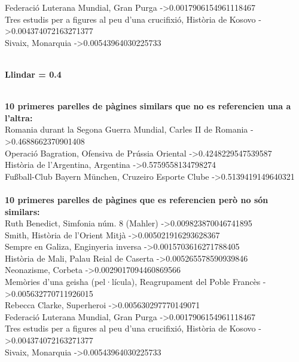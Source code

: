 \documentclass[11pt,a4paper,twoside]{report}
\begin{document}
Federació Luterana Mundial, Gran Purga -\textgreater 0.0017906154961118467 \\ 
Tres estudis per a figures al peu d'una crucifixió, Història de Kosovo -\textgreater 0.004374072163271377 \\ 
Sivaix, Monarquia -\textgreater 0.00543964030225733 \\ 
 \\ 
\newline
\centerline{ \textbf{Llindar = 0.4} }
\newline
 \\ 
\textbf{10 primeres parelles de pàgines similars que no es referencien una a l'altra:} \\ 
Romania durant la Segona Guerra Mundial, Carles II de Romania -\textgreater 0.4688662370901408 \\ 
Operació Bagration, Ofensiva de Prússia Oriental -\textgreater 0.4248229547539587 \\ 
Història de l'Argentina, Argentina -\textgreater 0.5759558134798274 \\ 
Fußball-Club Bayern München, Cruzeiro Esporte Clube -\textgreater 0.5139419149640321 \\ 
 \\ 
\textbf{10 primeres parelles de pàgines que es referencien però no són similars:} \\ 
Ruth Benedict, Simfonia núm. 8 (Mahler) -\textgreater 0.009823870046741895 \\ 
Smith, Història de l'Orient Mitjà -\textgreater 0.005021916293628367 \\ 
Sempre en Galiza, Enginyeria inversa -\textgreater 0.0015703616271788405 \\ 
Història de Mali, Palau Reial de Caserta -\textgreater 0.005265578590939846 \\ 
Neonazisme, Corbeta -\textgreater 0.0029017094460869566 \\ 
Memòries d'una geisha (pel·lícula), Reagrupament del Poble Francès -\textgreater 0.005632770711926015 \\ 
Rebecca Clarke, Superheroi -\textgreater 0.005630297770149071 \\ 
Federació Luterana Mundial, Gran Purga -\textgreater 0.0017906154961118467 \\ 
Tres estudis per a figures al peu d'una crucifixió, Història de Kosovo -\textgreater 0.004374072163271377 \\ 
Sivaix, Monarquia -\textgreater 0.00543964030225733 \\ 
 \\ 
\end{document}
